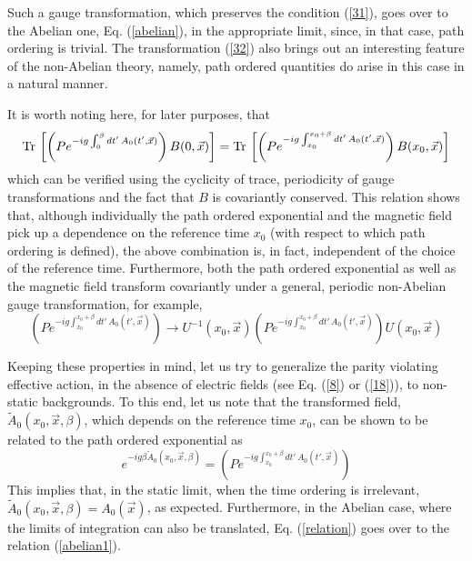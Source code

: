 \documentclass[a4paper,12pt]{article}
\begin{document}
Such a gauge transformation, which preserves the condition (\ref{31}), goes
over to the Abelian one, Eq. (\ref{abelian}), in the appropriate
limit, since, in that case, path ordering is trivial. The
transformation (\ref{32})  also brings
out an interesting feature of the non-Abelian theory, namely, path
ordered quantities \cite{Polyakov:1987ez} do arise in this case in a
natural manner. 

It is worth noting here, for later purposes, that
\begin{equation}
{\rm Tr}\,\left[\left(P e^{-ig\int_{0}^{\beta}
      dt'\,A_{0}(t',\vec{x})}\right)B(0,\vec{x})\right] = {\rm
      Tr}\,\left[\left(P e^{-ig\int_{x_{0}}^{x_{0}+\beta}
      dt'\,A_{0}(t',\vec{x})}\right)B(x_{0},\vec{x})\right]\label{trace}
\end{equation}
which can be verified using the cyclicity of trace, periodicity of
gauge transformations and the fact that $B$ is covariantly
conserved. This relation shows that, although individually the
path ordered exponential and the magnetic field pick up a dependence
on the reference time $x_{0}$ (with respect to which path ordering is
defined), the above combination is, in fact,
independent of the choice of the reference time. Furthermore, both the
path ordered exponential as well as the magnetic field transform
covariantly under a general, periodic non-Abelian gauge
transformation, for example,
\begin{equation}
\left(P e^{-ig\int_{x_{0}}^{x_{0}+\beta} dt'\,A_{0}(t',\vec{x})}\right)
\rightarrow U^{-1}(x_{0},\vec{x})\left(P
  e^{-ig\int_{x_{0}}^{x_{0}+\beta} dt'\,A_{0}(t',\vec{x})}\right)
U(x_{0},\vec{x})\label{transf}
\end{equation}
 
Keeping these properties in mind, let us try to generalize the parity violating
effective action, in the absence of electric fields (see Eq. (\ref{8})
or (\ref{18})), to non-static
backgrounds. To this end, let us note that the transformed field,
$\tilde{A}_{0}(x_{0},\vec{x},\beta)$, which depends on the reference
time $x_{0}$, can be shown to be related to the path ordered
exponential as
\begin{equation}
e^{-ig\beta \tilde{A}_{0}(x_{0},\vec{x},\beta)} = \left(P
  e^{-ig\int_{x_{0}}^{x_{0}+\beta}
  dt'\,A_{0}(t',\vec{x})}\right)\label{relation}
\end{equation}
This implies that, in the static limit, when the time ordering is
irrelevant, $\tilde{A}_{0}(x_{0},\vec{x},\beta)=A_{0}(\vec{x})$, as
expected. Furthermore, in the Abelian case, where the limits of
integration can also be translated, Eq. (\ref{relation}) goes over to
the relation (\ref{abelian1}).
\end{document}
